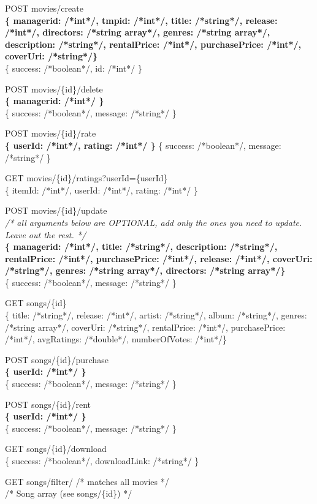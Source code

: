 POST movies/create \\
\textbf{\{ managerid: /*int*/, tmpid: /*int*/, title: /*string*/, release: /*int*/, directors: /*string array*/, 
genres: /*string array*/, description: /*string*/, rentalPrice: /*int*/, purchasePrice: /*int*/, coverUri: /*string*/\}} \\
\{ success: /*boolean*/, id: /*int*/ \}

POST movies/\{id\}/delete \\
\textbf{\{ managerid: /*int*/ \}} \\
\{ success: /*boolean*/, message: /*string*/ \}

POST movies/\{id\}/rate \\
\textbf{\{ userId: /*int*/, rating: /*int*/ \}}
\{ success: /*boolean*/, message: /*string*/ \}

GET movies/\{id\}/ratings?userId=\{userId\} \\
\{ itemId: /*int*/, userId: /*int*/, rating: /*int*/ \}

POST movies/\{id\}/update \\
\emph{/* all arguments below are OPTIONAL, add only the ones you need to update. Leave out the rest. */} \\
\textbf{\{ managerid: /*int*/, title: /*string*/, description: /*string*/, rentalPrice: /*int*/, purchasePrice: /*int*/, 
release: /*int*/, coverUri: /*string*/, genres: /*string array*/, directors: /*string array*/\}} \\
\{ success: /*boolean*/, message: /*string*/ \}

GET  songs/\{id\} \\
\{ title: /*string*/, release: /*int*/, artist: /*string*/, album: /*string*/, genres: /*string array*/, coverUri: /*string*/, rentalPrice: /*int*/, purchasePrice: /*int*/, avgRatings: /*double*/, numberOfVotes: /*int*/\}

POST songs/\{id\}/purchase \\
\textbf{\{ userId: /*int*/ \}} \\
\{ success: /*boolean*/, message: /*string*/ \}

POST songs/\{id\}/rent \\
\textbf{\{ userId: /*int*/ \}} \\
\{ success: /*boolean*/, message: /*string*/ \}

GET  songs/\{id\}/download \\
\{ success: /*boolean*/, downloadLink: /*string*/ \}

GET  songs/filter/ /* matches all movies */ \\
/* Song array (see songs/\{id\}) */

